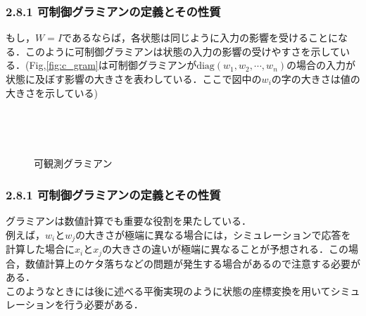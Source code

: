 \begin{frame}[t]
\frametitle{2.8.1 可制御グラミアンの定義とその性質}
もし，$W=I$であるならば，各状態は同じように入力の影響を受けることになる．このように可制御グラミアンは状態の入力の影響の受けやすさを示している．(Fig,\ref{fig:c_gram}は可制御グラミアンが$\mbox{diag}(w_1, w_2, \cdots, w_n)$の場合の入力が状態に及ぼす影響の大きさを表わしている．ここで図中の$w_i$の字の大きさは値の大きさを示している)



\begin{figure}[htbp]
\begin{center}
\begin{minipage}[c]{5cm}
 \begin{center}
  \caption{可制御グラミアン}
  \label{fig:c_gram}
 \end{center}
\end{minipage}
\begin{minipage}{5cm}
 \begin{center}
  \caption{可観測グラミアン}
  \label{fig:o_gram}
 \end{center}
\end{minipage}
\end{center}
\end{figure}
\end{frame}

\begin{frame}[t]
\frametitle{2.8.1 可制御グラミアンの定義とその性質}

グラミアンは数値計算でも重要な役割を果たしている．
\\[3mm]

例えば，$w_i$と$w_j$の大きさが極端に異なる場合には，シミュレーションで応答を計算した場合に$x_i$と$x_j$の大きさの違いが極端に異なることが予想される．この場合，数値計算上のケタ落ちなどの問題が発生する場合があるので注意する必要がある．
\\[3mm]

このようなときには後に述べる平衡実現のように状態の座標変換を用いてシミュレーションを行う必要がある．
\end{frame}

